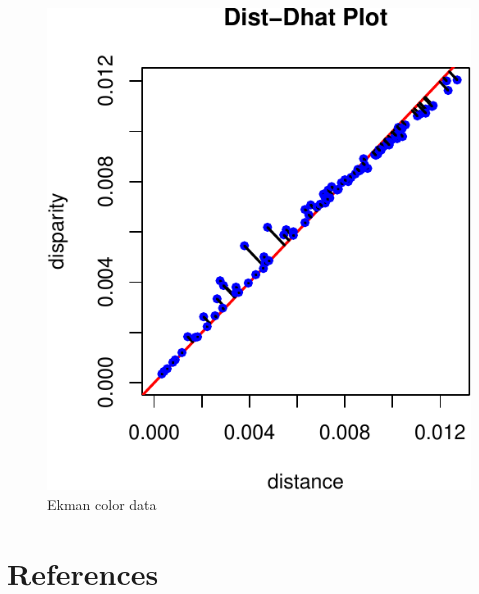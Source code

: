 \documentclass[
  12pt,
]{article}
\begin{document}
\begin{figure}

{\centering \includegraphics{smacofPC_files/figure-latex/ekmandd-1} 

}

\caption{Ekman color data}\label{fig:ekmandd}
\end{figure}

\section*{References}\label{references}
\end{document}
